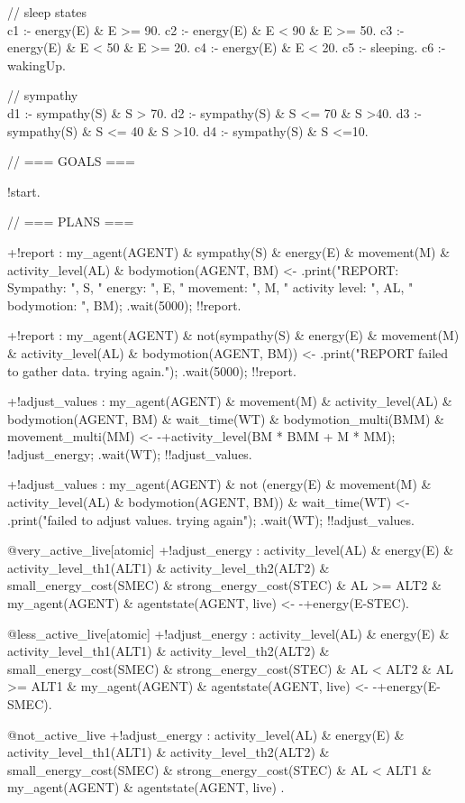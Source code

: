 \documentclass[draft,final]{vutinfth} %
\begin{document}
{// sleep states\\
c1 :- energy(E) \& E >= 90.
c2 :- energy(E) \& E < 90 \& E >= 50.
c3 :- energy(E) \& E < 50 \& E >= 20.
c4 :- energy(E) \& E < 20.
c5 :- sleeping.
c6 :- wakingUp.

// sympathy\\
d1 :- sympathy(S) \& S > 70.
d2 :- sympathy(S) \& S <= 70 \& S >40.
d3 :- sympathy(S) \& S <= 40 \& S >10.
d4 :- sympathy(S) \& S <=10.


// === GOALS ===

!start.

// === PLANS ===

+!report : my\_agent(AGENT) \& sympathy(S) \& energy(E) \& movement(M) \& activity\_level(AL) \& bodymotion(AGENT, BM)
    <-  .print("REPORT: Sympathy: ", S, " energy: ", E, " movement: ", M, " activity level: ", AL, " bodymotion: ", BM);
        .wait(5000);
        !!report.

+!report : my\_agent(AGENT) \& not(sympathy(S) \& energy(E) \& movement(M) \& activity\_level(AL) \& bodymotion(AGENT, BM))
    <-  .print("REPORT failed to gather data. trying again.");
        .wait(5000);
        !!report.

+!adjust\_values : my\_agent(AGENT) \& movement(M) \& activity\_level(AL) \& bodymotion(AGENT, BM) \& wait\_time(WT) \& bodymotion\_multi(BMM) \& movement\_multi(MM)
    <-  -+activity\_level(BM * BMM + M * MM);
        !adjust\_energy;
        .wait(WT);
        !!adjust\_values.

+!adjust\_values : my\_agent(AGENT) \& not (energy(E) \& movement(M) \& activity\_level(AL) \& bodymotion(AGENT, BM)) \& wait\_time(WT)
    <-  .print("failed to adjust values. trying again");
        .wait(WT);
        !!adjust\_values.

@very\_active\_live[atomic]
+!adjust\_energy : activity\_level(AL) \& energy(E) \& activity\_level\_th1(ALT1) \& activity\_level\_th2(ALT2) \& small\_energy\_cost(SMEC)
    \& strong\_energy\_cost(STEC) \& AL >= ALT2 \& my\_agent(AGENT) \& agentstate(AGENT, live)
    <-  -+energy(E-STEC).

@less\_active\_live[atomic]
+!adjust\_energy : activity\_level(AL) \& energy(E) \& activity\_level\_th1(ALT1) \& activity\_level\_th2(ALT2) \& small\_energy\_cost(SMEC)
    \& strong\_energy\_cost(STEC) \& AL < ALT2 \& AL >= ALT1 \& my\_agent(AGENT) \& agentstate(AGENT, live)
    <-  -+energy(E-SMEC).

@not\_active\_live
+!adjust\_energy : activity\_level(AL) \& energy(E) \& activity\_level\_th1(ALT1) \& activity\_level\_th2(ALT2) \& small\_energy\_cost(SMEC)
    \& strong\_energy\_cost(STEC) \& AL < ALT1 \& my\_agent(AGENT) \& agentstate(AGENT, live) .

}
\end{document}

